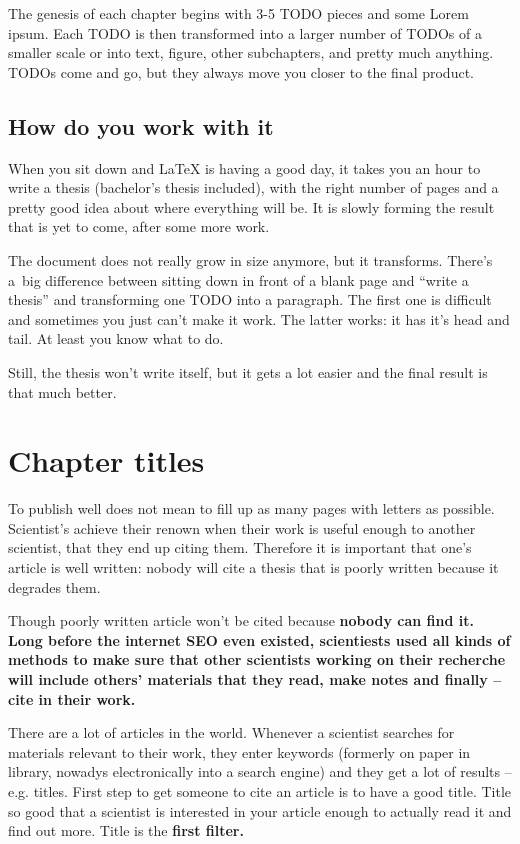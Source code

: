 The genesis of each chapter begins with 3-5 TODO pieces and some Lorem ipsum. Each TODO is then transformed into a larger number of TODOs of a smaller scale or into text, figure, other subchapters, and pretty much anything. TODOs come and go, but they always move you closer to the final product.

\subsection*{How do you work with it}

When you sit down and LaTeX is having a good day, it takes you an hour to write a thesis (bachelor's thesis included), with the right number of pages and a pretty good idea about where everything will be. It is slowly forming the result that is yet to come, after some more work.

The document does not really grow in size anymore, but it transforms. There's a~big difference between sitting down in front of a blank page and ``write a thesis'' and transforming one TODO into a paragraph. The first one is difficult and sometimes you just can't make it work. The latter works: it has it's head and tail. At least you know what to do.

Still, the thesis won't write itself, but it gets a lot easier and the final result is that much better.


\section{Chapter titles}

To publish well does not mean to fill up as many pages with letters as possible. Scientist's achieve their renown when their work is useful enough to another scientist, that they end up citing them. Therefore it is important that one's article is well written: nobody will cite a thesis that is poorly written because it degrades them.

Though poorly written article won't be cited because \bf nobody can find it\rm. Long before the internet SEO even existed, scientiests used all kinds of methods to make sure that other scientists working on their recherche will include others' materials that they read, make notes and finally -- cite in their work.

There are a lot of articles in the world. Whenever a scientist searches for materials relevant to their work, they enter keywords (formerly on paper in library, nowadys electronically into a search engine) and they get a lot of results -- e.g. titles. First step to get someone to cite an article is to have a good title. Title so good that a scientist is interested in your article enough to actually read it and find out more. Title is the \bf first filter\rm.


